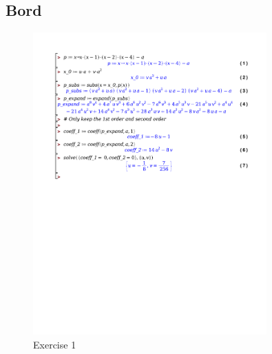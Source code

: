 \documentclass[a4paper]{report}
\begin{document}



\subsection{Bord}

\begin{figure}[H]
	\centering
	\includegraphics[width=0.8\textwidth]{./exercises/bordles_1.pdf}
	\caption{Exercise 1}
\end{figure}
\end{document}
